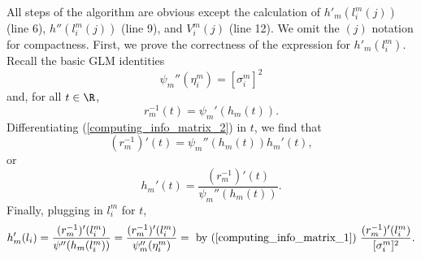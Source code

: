 \documentclass[12pt]{article}
\begin{document}
\begin{appendices}
All steps of the algorithm are obvious except the calculation of $h'_m(l^m_i(j))$ (line 6), $h''(l^m_i(j))$ (line 9), and $V^m_i(j)$ (line 12). We omit the $(j)$ notation for compactness. First, we prove the correctness of the expression for $h'_m(l^m_i)$. Recall the basic GLM identities
\begin{equation}\label{computing_info_matrix_1}
\psi_m''(\eta_i^m) =  [\sigma^m_i]^2
\end{equation}
 and, for all $t \in \R$, 
\begin{equation}\label{computing_info_matrix_2}
 r_m^{-1}(t) = \psi_m'(h_m(t)).
\end{equation}
 Differentiating (\ref{computing_info_matrix_2}) in $t$, we find that
\begin{equation}\label{computing_info_matrix_3}
 (r_m^{-1})'(t) = \psi_m''(h_m(t))h_m'(t), 
\end{equation}
or  $$h_m'(t) = \frac{(r_m^{-1})'(t) }{\psi_m''(h_m(t))}.$$ Finally, plugging in $l^m_i$ for $t$,
$$ h_m'(l_i) = \frac{(r_m^{-1})'(l^m_i)}{\psi''(h_m(l^m_i))} = \frac{(r_m^{-1})'(l^m_i)}{\psi_m''(\eta^m_i)} = \textrm{ by (\ref{computing_info_matrix_1}) } \frac{(r_m^{-1})'(l_i^m)}{[\sigma_i^m]^2}.$$


\end{appendices}
\end{document}
